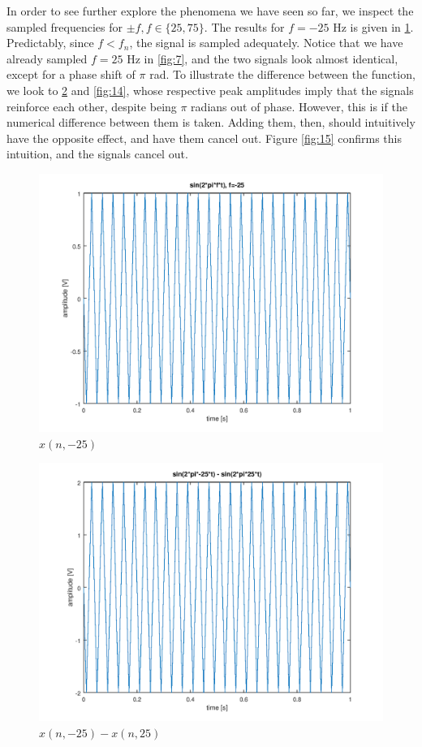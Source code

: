 \documentclass[a4paper, 12pt]{report}
\begin{document}
			In order to see further explore the phenomena we have seen so far, we inspect the sampled frequencies for $\pm f, f \in \{25, 75\}$. The results for $f = -25$ Hz is given in \ref{fig:12}. Predictably, since $f < f_n$, the signal is sampled adequately. Notice that we have already sampled $f = 25$ Hz in \ref{fig:7}, and the two signals look almost identical, except for a phase shift of $\pi$ rad. To illustrate the difference between the function, we look to \ref{fig:13} and \ref{fig:14}, whose respective peak amplitudes imply that the signals reinforce each other, despite being $\pi$ radians out of phase. However, this is if the numerical difference between them is taken. Adding them, then, should intuitively have the opposite effect, and have them cancel out. Figure \ref{fig:15} confirms this intuition, and the signals cancel out.

			\begin{figure}[H]
				\label{fig:12}
				\includegraphics[width=\textwidth]{img/1_12_-25.png}
				\caption{$x(n, -25)$}
			\end{figure}

			\begin{figure}[H]
				\label{fig:13}
				\includegraphics[width=\textwidth]{img/1_13_diff.png}
				\caption{$x(n, -25) - x(n, 25)$}
			\end{figure}
\end{document}
